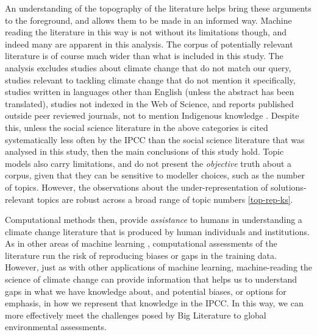 \documentclass{article}
\begin{document}
\begin{linenumbers}
		An understanding of the topography of the literature helps bring these arguments to the foreground, and allows them to be made in an informed way. Machine reading the literature in this way is not without its limitations though, and indeed many are apparent in this analysis. The corpus of potentially relevant literature is of course much wider than what is included in this study. The analysis excludes studies about climate change that do not match our query, studies relevant to tackling climate change that do not mention it specifically, studies written in languages other than English (unless the abstract has been translated), studies not indexed in the Web of Science, and reports published outside peer reviewed journals, not to mention Indigenous knowledge \cite{Ford2016b}. Despite this, unless the social science literature in the above categories is cited systematically less often  by the IPCC than the social science literature that was analysed in this study, then the main conclusions of this study hold. Topic models also carry limitations, and do not present the \textit{objective} truth about a corpus, given that they can be sensitive to modeller choices, such as the number of topics. However, the observations about the under-representation of solutions-relevant topics are robust across a broad range of topic numbers \ref{top-rep-ks}.
		
		Computational methods then, provide \textit{assistance} to humans in understanding a climate change literature that is produced by human individuals and institutions.  As in other areas of machine learning \cite{Barocas2016}, computational assessments of the literature run the risk of reproducing biases or gaps in the training data. However, just as with other applications of machine learning, machine-reading the science of climate change can provide information that helps us to understand gaps in what we have knowledge about, and potential biases, or options for emphasis, in how we represent that knowledge in the IPCC. In this way, we can more effectively meet the challenges posed by Big Literature to global environmental assessments.
		
	\end{linenumbers}
	
	\appendix
	
\end{document}
